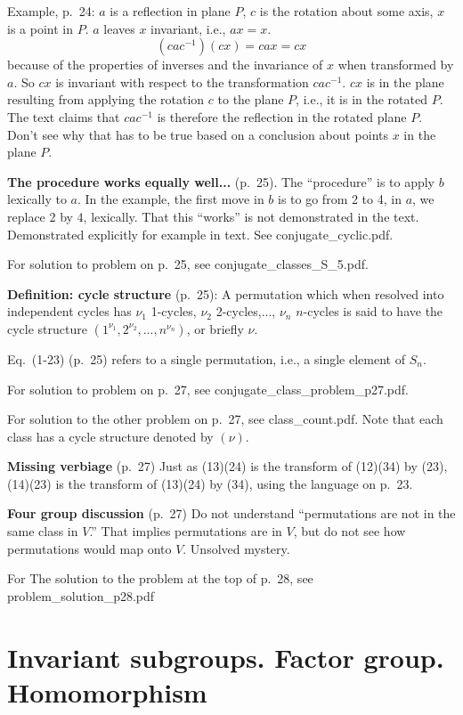 Example, p.\ 24: $a$ is a reflection in plane $P$, $c$ is the rotation
about some axis, $x$ is a point in $P$. $a$ leaves $x$ invariant,
i.e., $ax = x$.
$$
(cac^{-1})(cx) = cax = cx
$$ because of the properties of inverses and the invariance of $x$
when transformed by $a$. So $cx$ is invariant with respect to the
transformation $cac^{-1}$. $cx$ is in the plane resulting from
applying the rotation $c$ to the plane $P$, i.e., it is in the rotated
$P$. The text claims that $cac^{-1}$ is therefore the reflection in
the rotated plane $P$. Don't see why that has to be true based on a
conclusion about points $x$ in the plane $P$.

{\bf The procedure works equally well...} (p.\ 25). The ``procedure''
is to apply $b$ lexically to $a$. In the example, the first move in $b$
is to go from 2 to 4, in $a$, we replace 2 by 4, lexically. That this
``works'' is not demonstrated in the text. Demonstrated explicitly
for example in text. See conjugate\_cyclic.pdf.

For solution to problem on p.\ 25, see conjugate\_classes\_S\_5.pdf.

{\bf Definition: cycle structure} (p.\ 25): A permutation which when
resolved into independent cycles has $\nu_1$ 1-cycles, $\nu_2$
2-cycles,..., $\nu_n$ $n$-cycles is said to have the cycle structure
$(1^{\nu_1},2^{\nu_2},...,n^{\nu_n})$, or briefly $\nu$.

Eq.\ (1-23) (p.\ 25) refers to a single permutation, i.e., a single element of $S_n$.

For solution to problem on p.\ 27, see conjugate\_class\_problem\_p27.pdf.

For solution to the other problem on p.\ 27, see class\_count.pdf. Note
that each class has a cycle structure denoted by $(\nu)$.

{\bf Missing verbiage} (p.\ 27) Just as (13)(24) is the transform of
(12)(34) by (23), (14)(23) is the transform of (13)(24) by (34), using
the language on p.\ 23.

{\bf Four group discussion} (p.\ 27) Do not understand ``permutations
are not in the same class in $V$.'' That implies permutations are in
$V$, but do not see how permutations would map onto $V$. Unsolved
mystery.

For The solution to the problem at the top of p.\ 28, see
problem\_solution\_p28.pdf

\section{Invariant subgroups. Factor group. Homomorphism}

